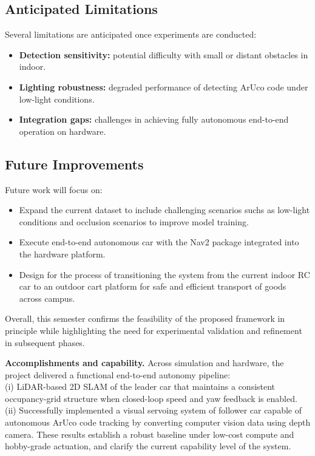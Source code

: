 \documentclass[journal,transmag]{IEEEtran}
\begin{document}
\subsection{Anticipated Limitations}
Several limitations are anticipated once experiments are conducted:
\begin{itemize}
    \item \textbf{Detection sensitivity:} potential difficulty with small or distant obstacles in indoor.
    \item \textbf{Lighting robustness:} degraded performance of detecting ArUco code under low-light conditions.
    \item \textbf{Integration gaps:} challenges in achieving fully autonomous end-to-end operation on hardware.
\end{itemize}

\subsection{Future Improvements}
Future work will focus on:
\begin{itemize}
    \item Expand the current dataset to include challenging scenarios suchs as low-light conditions and occlusion scenarios to improve model training.

    \item Execute end-to-end autonomous car with the Nav2 package integrated into the hardware platform.

    \item Design for the process of transitioning the system from the current indoor RC car to an outdoor cart platform for safe and efficient transport of goods across campus.  
\end{itemize}

Overall, this semester confirms the feasibility of the proposed framework in principle while highlighting the need for experimental validation and refinement in subsequent phases.


\noindent\textbf{Accomplishments and capability.} Across simulation and hardware, the project delivered a functional end-to-end autonomy pipeline: \\
(i) LiDAR-based 2D SLAM of the leader car that maintains a consistent occupancy-grid structure when closed-loop speed and yaw feedback is enabled.\\
(ii) Successfully implemented a visual servoing system of follower car capable of autonomous ArUco code tracking by converting computer vision data using depth camera.
These results establish a robust baseline under low-cost compute and hobby-grade actuation, and clarify the current capability level of the system.
\end{document}
